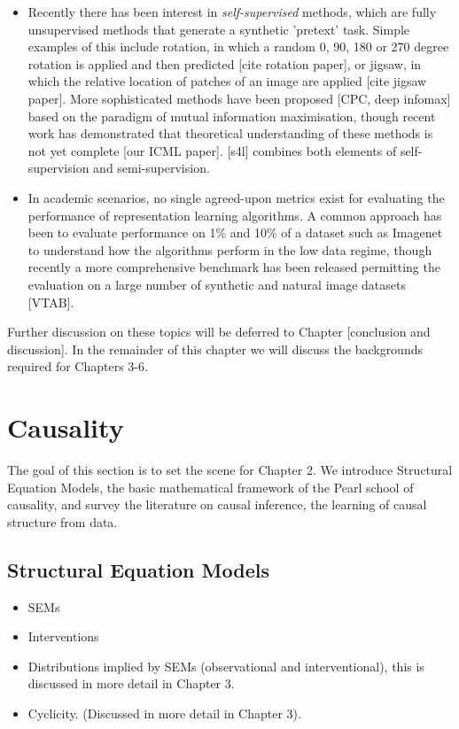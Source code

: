 \begin{itemize}
	\item Recently there has been interest in \emph{self-supervised} methods, which are fully unsupervised methods that generate a synthetic 'pretext' task. Simple examples of this include rotation, in which a random 0, 90, 180 or 270 degree rotation is applied and then predicted [cite rotation paper], or jigsaw, in which the relative location of patches of an image are applied [cite jigsaw paper]. More sophisticated methods have been proposed [CPC, deep infomax] based on the paradigm of mutual information maximisation, though recent work has demonstrated that theoretical understanding of these methods is not yet complete [our ICML paper]. [s4l] combines both elements of self-supervision and semi-supervision.
	\item In academic scenarios, no single agreed-upon metrics exist for evaluating the performance of representation learning algorithms. A common approach has been to evaluate performance on 1\% and 10\% of a dataset such as Imagenet to understand how the algorithms perform in the low data regime, though recently a more comprehensive benchmark has been released permitting the evaluation on a large number of synthetic and natural image datasets [VTAB].
\end{itemize}

Further discussion on these topics will be deferred to Chapter [conclusion and discussion]. In the remainder of this chapter we will discuss the backgrounds required for Chapters 3-6.

\section{Causality}

The goal of this section is to set the scene for Chapter 2. We introduce Structural Equation Models, the basic mathematical framework of the Pearl school of causality, and survey the literature on causal inference, the learning of causal structure from data.

\subsection{Structural Equation Models}

\begin{itemize}
\item SEMs
\item Interventions
\item Distributions implied by SEMs (observational and interventional), this is discussed in more detail in Chapter 3.
\item Cyclicity. (Discussed in more detail in Chapter 3).
\end{itemize}

